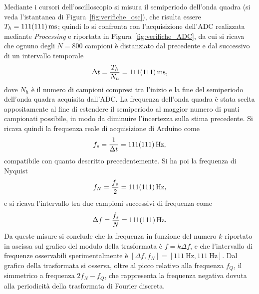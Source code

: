 \documentclass[10pt,oneside,a4paper]{article}
\newenvironment{Figure}
  {\par\medskip\noindent\minipage{\linewidth}}
  {\endminipage\par\medskip}
\begin{document}
\begin{multicols}{2}
Mediante i cursori dell'oscilloscopio si misura il semiperiodo dell'onda quadra (si veda l'istantanea di Figura~\ref{fig:verifiche_osc}), che risulta essere $T_h = \SI{111 \pm 111}{ms}$; quindi lo si confronta con l'acquisizione dell'ADC realizzata mediante \emph{Processing} e riportata in Figura~\ref{fig:verifiche_ADC}, da cui si ricava che ognuno degli $N=800$ campioni è distanziato dal precedente e dal successivo di un intervallo temporale
\[
\Delta t = \frac{T_h}{N_h} = \SI{111 \pm 111}{ms},
\]
dove $N_h$ è il numero di campioni compresi tra l'inizio e la fine del semiperiodo dell'onda quadra acquisita dall'ADC. La frequenza dell'onda quadra è stata scelta appositamente al fine di estendere il semiperiodo al maggior numero di punti campionati possibile, in modo da diminuire l'incertezza sulla stima precedente. Si ricava quindi la frequenza reale di acquisizione di Arduino come
\[
f_s = \frac{1}{\Delta t} = \SI{111 \pm 111}{\Hz},
\]
compatibile con quanto descritto precedentemente. Si ha poi la frequenza di Nyquist
\[
f_N = \frac{f_s}{2} = \SI{111 \pm 111}{\Hz},
\]
e si ricava l'intervallo tra due campioni successivi di frequenza come
\begin{equation}\label{eq:ktof}
\Delta f = \frac{f_s}{N} = \SI{111 \pm 111}{\Hz}.
\end{equation}
Da queste misure si conclude che la frequenza in funzione del numero $k$ riportato in ascissa sul grafico del modulo della trasformata è $f = k \Delta f$, e che l'intervallo di frequenze osservabili sperimentalmente è $[\Delta f, f_N] = [\SI{111}{\Hz}, \SI{111}{\Hz}]$. Dal grafico della trasformata si osserva, oltre al picco relativo alla frequenza $f_Q$, il simmetrico a frequenza $2f_N - f_Q$, che rappresenta la frequenza negativa dovuta alla periodicità della trasformata di Fourier discreta.





\end{multicols}
\end{document}
